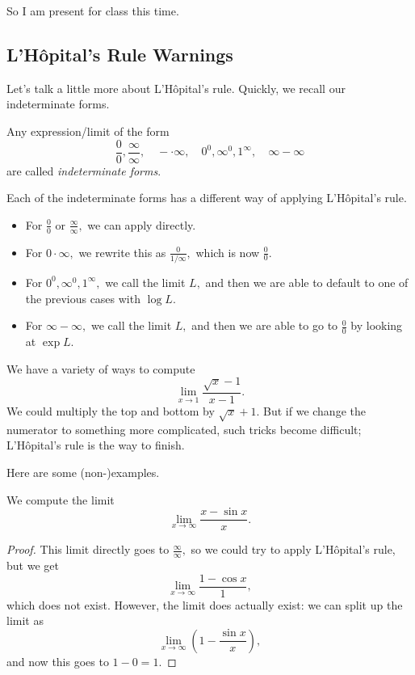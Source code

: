 

















So I am present for class this time.

\subsection{L'H\^opital's Rule Warnings}
Let's talk a little more about L'H\^{opital}'s rule. Quickly, we recall our indeterminate forms.
\begin{definition}
	Any expression/limit of the form
	\[\frac00,\frac\infty\infty,\quad-\cdot\infty,\quad0^0,\infty^0,1^\infty,\quad\infty-\infty\]
	are called \textit{indeterminate forms}.
\end{definition}
Each of the indeterminate forms has a different way of applying L'H\^opital's rule.
\begin{itemize}
	\item For $\frac00$ or $\frac\infty\infty,$ we can apply directly.
	\item For $0\cdot\infty,$ we rewrite this as $\frac0{1/\infty},$ which is now $\frac00.$
	\item For $0^0,\infty^0,1^\infty,$ we call the limit $L,$ and then we are able to default to one of the previous cases with $\log L.$
	\item For $\infty-\infty,$ we call the limit $L,$ and then we are able to go to $\frac00$ by looking at $\exp L.$
\end{itemize}
\begin{example}
	We have a variety of ways to compute
	\[\lim_{x\to1}\frac{\sqrt x-1}{x-1}.\]
	We could multiply the top and bottom by $\sqrt x+1.$ But if we change the numerator to something more complicated, such tricks become difficult; L'H\^opital's rule is the way to finish.
\end{example}
Here are some (non-)examples.
\begin{exercise}
	We compute the limit
	\[\lim_{x\to\infty}\frac{x-\sin x}x.\]
\end{exercise}
\begin{proof}
	This limit directly goes to $\frac\infty\infty,$ so we could try to apply L'H\^opital's rule, but we get
	\[\lim_{x\to\infty}\frac{1-\cos x}1,\]
	which does not exist. However, the limit does actually exist: we can split up the limit as
	\[\lim_{x\to\infty}\left(1-\frac{\sin x}x\right),\]
	and now this goes to $1-0=\boxed1.$
\end{proof}
